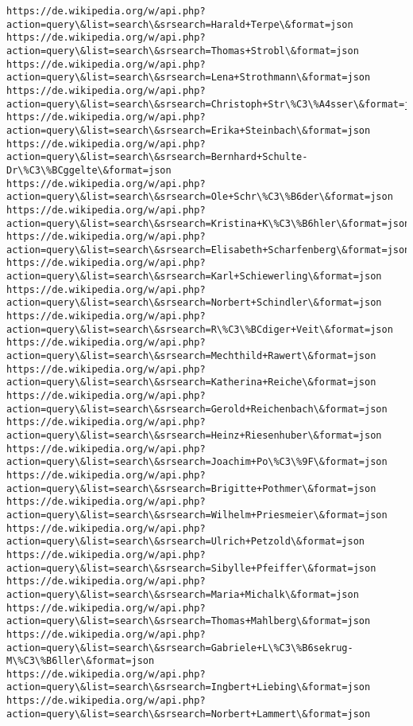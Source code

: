 \documentclass[11pt]{article}
\begin{document}
\begin{Verbatim}[commandchars=\\\{\}]
https://de.wikipedia.org/w/api.php?action=query\&list=search\&srsearch=Harald+Terpe\&format=json
https://de.wikipedia.org/w/api.php?action=query\&list=search\&srsearch=Thomas+Strobl\&format=json
https://de.wikipedia.org/w/api.php?action=query\&list=search\&srsearch=Lena+Strothmann\&format=json
https://de.wikipedia.org/w/api.php?action=query\&list=search\&srsearch=Christoph+Str\%C3\%A4sser\&format=json
https://de.wikipedia.org/w/api.php?action=query\&list=search\&srsearch=Erika+Steinbach\&format=json
https://de.wikipedia.org/w/api.php?action=query\&list=search\&srsearch=Bernhard+Schulte-Dr\%C3\%BCggelte\&format=json
https://de.wikipedia.org/w/api.php?action=query\&list=search\&srsearch=Ole+Schr\%C3\%B6der\&format=json
https://de.wikipedia.org/w/api.php?action=query\&list=search\&srsearch=Kristina+K\%C3\%B6hler\&format=json
https://de.wikipedia.org/w/api.php?action=query\&list=search\&srsearch=Elisabeth+Scharfenberg\&format=json
https://de.wikipedia.org/w/api.php?action=query\&list=search\&srsearch=Karl+Schiewerling\&format=json
https://de.wikipedia.org/w/api.php?action=query\&list=search\&srsearch=Norbert+Schindler\&format=json
https://de.wikipedia.org/w/api.php?action=query\&list=search\&srsearch=R\%C3\%BCdiger+Veit\&format=json
https://de.wikipedia.org/w/api.php?action=query\&list=search\&srsearch=Mechthild+Rawert\&format=json
https://de.wikipedia.org/w/api.php?action=query\&list=search\&srsearch=Katherina+Reiche\&format=json
https://de.wikipedia.org/w/api.php?action=query\&list=search\&srsearch=Gerold+Reichenbach\&format=json
https://de.wikipedia.org/w/api.php?action=query\&list=search\&srsearch=Heinz+Riesenhuber\&format=json
https://de.wikipedia.org/w/api.php?action=query\&list=search\&srsearch=Joachim+Po\%C3\%9F\&format=json
https://de.wikipedia.org/w/api.php?action=query\&list=search\&srsearch=Brigitte+Pothmer\&format=json
https://de.wikipedia.org/w/api.php?action=query\&list=search\&srsearch=Wilhelm+Priesmeier\&format=json
https://de.wikipedia.org/w/api.php?action=query\&list=search\&srsearch=Ulrich+Petzold\&format=json
https://de.wikipedia.org/w/api.php?action=query\&list=search\&srsearch=Sibylle+Pfeiffer\&format=json
https://de.wikipedia.org/w/api.php?action=query\&list=search\&srsearch=Maria+Michalk\&format=json
https://de.wikipedia.org/w/api.php?action=query\&list=search\&srsearch=Thomas+Mahlberg\&format=json
https://de.wikipedia.org/w/api.php?action=query\&list=search\&srsearch=Gabriele+L\%C3\%B6sekrug-M\%C3\%B6ller\&format=json
https://de.wikipedia.org/w/api.php?action=query\&list=search\&srsearch=Ingbert+Liebing\&format=json
https://de.wikipedia.org/w/api.php?action=query\&list=search\&srsearch=Norbert+Lammert\&format=json

\end{Verbatim}
\end{document}
